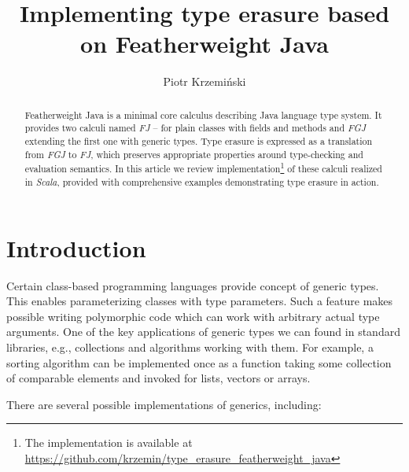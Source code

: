 \documentclass{article}[12pt]
\author{Piotr Krzemiński}
\title{Implementing type erasure based on Featherweight Java}
\date{}
\begin{document}
\maketitle


\begin{abstract}
Featherweight Java is a minimal core calculus describing Java language
type system. It provides two calculi named \emph{FJ} -- for plain
classes with fields and methods and \emph{FGJ} extending the first
one with generic types. Type erasure is expressed as a translation
from \emph{FGJ} to \emph{FJ}, which preserves appropriate properties
around type-checking and evaluation semantics. In this article
we review implementation\footnote{The implementation is available
at \url{https://github.com/krzemin/type_erasure_featherweight_java}}
of these calculi realized in \emph{Scala},
provided with comprehensive examples demonstrating type erasure in
action.
\end{abstract}


\section{Introduction}

Certain class-based programming languages provide concept of generic
types. This enables parameterizing classes with type parameters.
Such a feature makes possible writing polymorphic code which can
work with arbitrary actual type arguments. One of the key applications
of generic types we can found in standard libraries, e.g.,
collections and algorithms working with them. For example, a
sorting algorithm can be implemented once as a function taking some
collection of comparable elements and invoked for lists, vectors
or arrays.

There are several possible implementations of generics, including:
\end{document}
